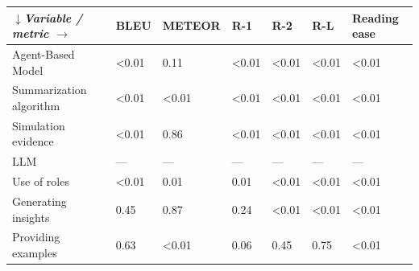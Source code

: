 \begin{tabular}{|l|l|l|l|l|l|l|}
\hline
\textit{$\downarrow$Variable / metric $\rightarrow$} & BLEU & METEOR & R-1 & R-2 & R-L & Reading ease \\
 \hline
 Agent-Based Model & \textless{}0.01 & 0.11 & \textless{}0.01 & \textless{}0.01 & \textless{}0.01 & \textless{}0.01 \\
 \hline
 Summarization algorithm & \textless{}0.01 & \textless{}0.01 & \textless{}0.01 & \textless{}0.01 & \textless{}0.01 & \textless{}0.01 \\
 \hline
 Simulation evidence & \textless{}0.01 & 0.86 & \textless{}0.01 & \textless{}0.01 & \textless{}0.01 & \textless{}0.01 \\
 \hline
 LLM & — & — & — & — & — & — \\
 \hline
 Use of roles & \textless{}0.01 & 0.01 & 0.01 & \textless{}0.01 & \textless{}0.01 & \textless{}0.01 \\
 \hline
 Generating insights & 0.45 & 0.87 & 0.24 & \textless{}0.01 & \textless{}0.01 & \textless{}0.01 \\
 \hline
 Providing examples & 0.63 & \textless{}0.01 & 0.06 & 0.45 & 0.75 & \textless{}0.01 \\
\hline
\end{tabular}
